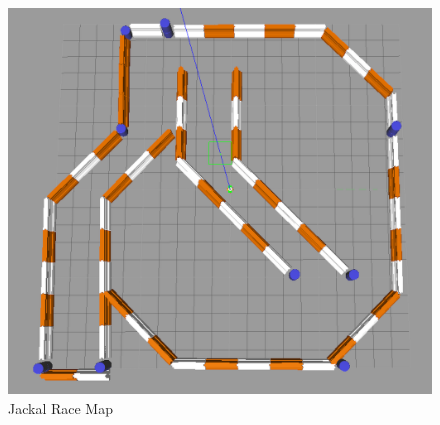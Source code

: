\documentclass[10pt,journal,compsoc]{IEEEtran}
\begin{document}
\begin{figure}[thpb]
      \centering
      \includegraphics[width=\linewidth]{where_am_i}
      \caption{Jackal Race Map}
      \label{fig:Map}
\end{figure}






\end{document}
